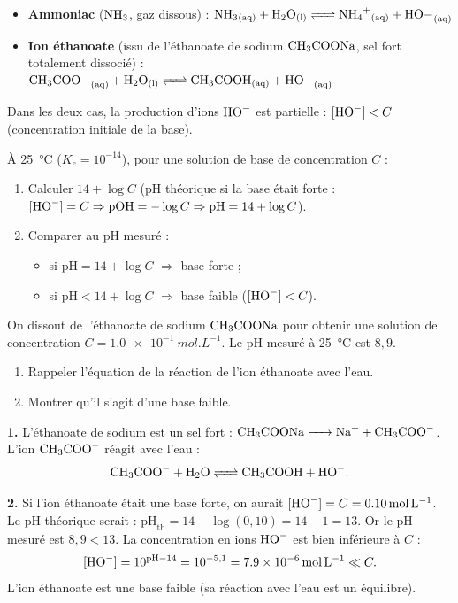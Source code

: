 \documentclass[11pt]{article}
\newcommand{\cle}[1]{{\popxbold\color{popdark}#1}}
\begin{document}
\begin{propriete}
\begin{itemize}
\item \textbf{Ammoniac} ($\ce{NH3}$, gaz dissous) : $\ce{NH3_{(aq)} + H2O_{(l)} <=> NH4+_{(aq)} + HO-_{(aq)}}$
\item \textbf{Ion éthanoate} (issu de l'éthanoate de sodium $\ce{CH3COONa}$, sel fort totalement dissocié) :
$\ce{CH3COO-_{(aq)} + H2O_{(l)} <=> CH3COOH_{(aq)} + HO-_{(aq)}}$
\end{itemize}
Dans les deux cas, la production d'ions $\ce{HO-}$ est partielle : $[\ce{HO-}] < C$ (concentration initiale de la base).
\end{propriete}

\begin{methode}
À \SI{25}{\celsius} ($K_e = 10^{-14}$), pour une solution de base de concentration $C$ :
\begin{enumerate}
\item Calculer $14 + \log C$ (pH théorique si la base était forte : $[\ce{HO-}] = C \Rightarrow \mathrm{pOH} = -\log C \Rightarrow \mathrm{pH} = 14 + \log C$).
\item Comparer au pH mesuré :
\begin{itemize}
\item si $\mathrm{pH} = 14 + \log C$ $\Rightarrow$ base \cle{forte} ;
\item si $\mathrm{pH} < 14 + \log C$ $\Rightarrow$ base \cle{faible} ($[\ce{HO-}] < C$).
\end{itemize}
\end{enumerate}
\end{methode}

\begin{exoresolu}
On dissout de l'éthanoate de sodium $\ce{CH3COONa}$ pour obtenir une solution de concentration $C = \SI{1,0e-1}{mol.L^{-1}}$. Le pH mesuré à \SI{25}{\celsius} est $8,9$.
\begin{enumerate}
\item Rappeler l'équation de la réaction de l'ion éthanoate avec l'eau.
\item Montrer qu'il s'agit d'une base faible.
\end{enumerate}
\tcblower
\textbf{1.} L'éthanoate de sodium est un sel fort : $\ce{CH3COONa -> Na+ + CH3COO-}$. L'ion $\ce{CH3COO-}$ réagit avec l'eau :
\[ \ce{CH3COO- + H2O <=> CH3COOH + HO-}. \]

\textbf{2.} Si l'ion éthanoate était une base forte, on aurait $[\ce{HO-}] = C = \SI{0,10}{mol.L^{-1}}$.
Le pH théorique serait : $\mathrm{pH}_{\text{th}} = 14 + \log(0,10) = 14 - 1 = 13$.
Or le pH mesuré est $8,9 < 13$. La concentration en ions $\ce{HO-}$ est bien inférieure à $C$ :
\[ [\ce{HO-}] = 10^{\mathrm{pH}-14} = 10^{-5,1} = \SI{7,9e-6}{mol.L^{-1}} \ll C. \]
L'ion éthanoate est une \cle{base faible} (sa réaction avec l'eau est un équilibre).
\end{exoresolu}
\end{document}
